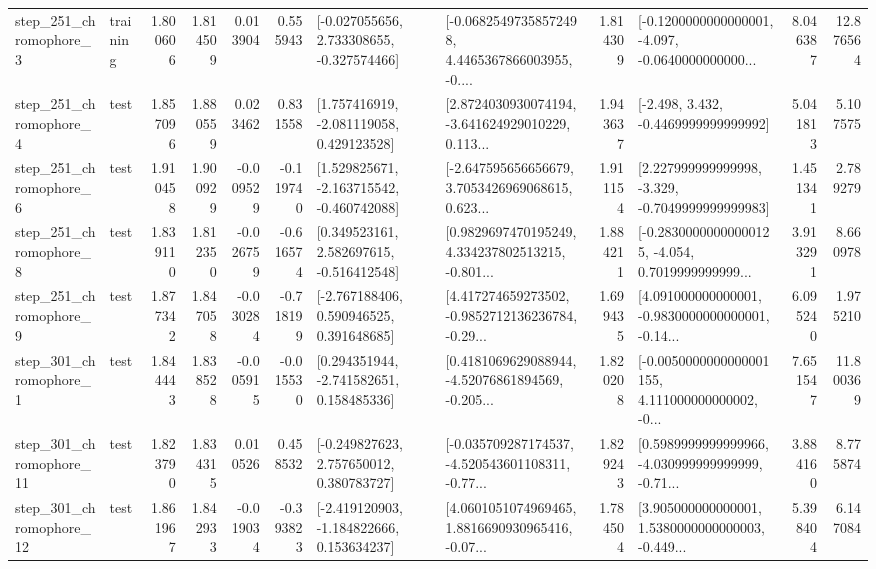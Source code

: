 \begin{tabular}{llrrrrllrlrr}
   step\_251\_chromophore\_3 &  training &      1.800606 &    1.814509 &      0.013904 &  0.555943 &   [-0.027055656, 2.733308655, -0.327574466] &  [-0.06825497358572498, 4.4465367866003955, -0.... &       1.814309 &  [-0.1200000000000001, -4.097, -0.0640000000000... &            8.046387 &         12.876564 \\
   step\_251\_chromophore\_4 &      test &      1.857096 &    1.880559 &      0.023462 &  0.831558 &    [1.757416919, -2.081119058, 0.429123528] &  [2.8724030930074194, -3.641624929010229, 0.113... &       1.943637 &               [-2.498, 3.432, -0.4469999999999992] &            5.041813 &          5.107575 \\
   step\_251\_chromophore\_6 &      test &      1.910458 &    1.900929 &     -0.009529 & -0.119740 &   [1.529825671, -2.163715542, -0.460742088] &  [-2.647595656656679, 3.7053426969068615, 0.623... &       1.911154 &   [2.227999999999998, -3.329, -0.7049999999999983] &            1.451341 &          2.789279 \\
   step\_251\_chromophore\_8 &      test &      1.839110 &    1.812350 &     -0.026759 & -0.616574 &    [0.349523161, 2.582697615, -0.516412548] &  [0.9829697470195249, 4.334237802513215, -0.801... &       1.884211 &  [-0.28300000000000125, -4.054, 0.7019999999999... &            3.913291 &          8.660978 \\
   step\_251\_chromophore\_9 &      test &      1.877342 &    1.847058 &     -0.030284 & -0.718199 &    [-2.767188406, 0.590946525, 0.391648685] &  [4.417274659273502, -0.9852712136236784, -0.29... &       1.699435 &  [4.091000000000001, -0.9830000000000001, -0.14... &            6.095240 &          1.975210 \\
   step\_301\_chromophore\_1 &      test &      1.844443 &    1.838528 &     -0.005915 & -0.015530 &    [0.294351944, -2.741582651, 0.158485336] &  [0.4181069629088944, -4.52076861894569, -0.205... &       1.820208 &  [-0.0050000000000001155, 4.111000000000002, -0... &            7.651547 &         11.800369 \\
  step\_301\_chromophore\_11 &      test &      1.823790 &    1.834315 &      0.010526 &  0.458532 &    [-0.249827623, 2.757650012, 0.380783727] &  [-0.035709287174537, -4.520543601108311, -0.77... &       1.829243 &  [0.5989999999999966, -4.030999999999999, -0.71... &            3.884160 &          8.775874 \\
  step\_301\_chromophore\_12 &      test &      1.861967 &    1.842933 &     -0.019034 & -0.393823 &   [-2.419120903, -1.184822666, 0.153634237] &  [4.0601051074969465, 1.8816690930965416, -0.07... &       1.784504 &  [3.905000000000001, 1.5380000000000003, -0.449... &            5.398404 &          6.147084 \\

\end{tabular}
